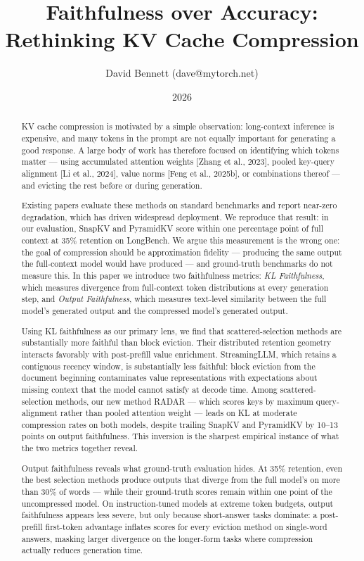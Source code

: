 \documentclass[10pt,letterpaper]{article}
\title{Faithfulness over Accuracy:\\Rethinking KV Cache Compression}
\author{David Bennett (dave@mytorch.net)}
\date{2026}
\begin{document}
\maketitle

\begin{abstract}
\normalsize
KV cache compression is motivated by a simple observation: long-context
inference is expensive, and many tokens in the prompt are not equally
important for generating a good response. A large body of work has
therefore focused on identifying which tokens matter --- using
accumulated attention weights {[}Zhang et al., 2023{]}, pooled key-query
alignment {[}Li et al., 2024{]}, value norms {[}Feng et al., 2025b{]},
or combinations thereof --- and evicting the rest before or during
generation.

Existing papers evaluate these methods on standard benchmarks and report
near-zero degradation, which has driven widespread deployment.
We reproduce that result: in our evaluation, SnapKV and PyramidKV score
within one percentage point of full context at 35\% retention on
LongBench. We argue this measurement is the wrong one: the goal of
compression should be approximation fidelity --- producing the same
output the full-context model would have produced --- and ground-truth
benchmarks do not measure this. In this paper we introduce two faithfulness metrics: \emph{KL
Faithfulness}, which measures divergence from full-context token
distributions at every generation step, and \emph{Output Faithfulness},
which measures text-level similarity between the full model's generated
output and the compressed model's generated output.

Using KL faithfulness as our primary lens, we find that scattered-selection
methods are substantially more faithful than block eviction. Their distributed
retention geometry interacts favorably with post-prefill value enrichment.
StreamingLLM, which retains a contiguous recency window, is substantially less
faithful: block eviction from the document beginning contaminates value
representations with expectations about missing context that the model cannot
satisfy at decode time. Among scattered-selection methods, our new method RADAR --- which scores
keys by maximum query-alignment rather than pooled attention weight --- leads on
KL at moderate compression rates on both models, despite trailing SnapKV and
PyramidKV by 10--13 points on output faithfulness. This inversion is the sharpest
empirical instance of what the two metrics together reveal.

Output faithfulness reveals what ground-truth evaluation hides. At 35\%
retention, even the best selection methods produce outputs that diverge
from the full model's on more than 30\% of words --- while their
ground-truth scores remain within one point of the uncompressed model.
On instruction-tuned models at extreme token budgets, output faithfulness
appears less severe, but only because short-answer tasks dominate: a
post-prefill first-token advantage inflates scores for every eviction
method on single-word answers, masking larger divergence on the
longer-form tasks where compression actually reduces generation time.
\end{abstract}
\end{document}
